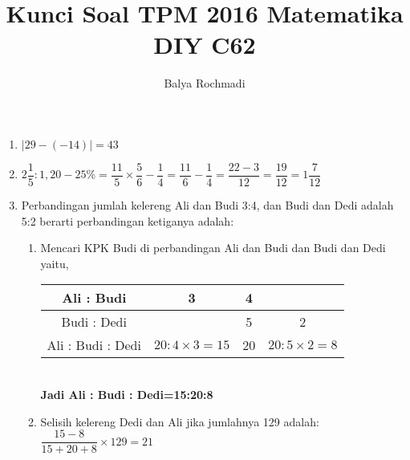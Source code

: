 \documentclass[10pt,a4paper]{article}
\author{Balya Rochmadi}
\title{Kunci Soal TPM 2016 Matematika DIY C62}
\begin{document}
    \maketitle
	\begin{enumerate}
	
	\item $\mid 29-(-14) \mid=43$
	\item $2\dfrac{1}{5} : 1,20 - 25\% = \dfrac{11}{5} \times \dfrac{5}{6} - \dfrac{1}{4} = \dfrac{11}{6}-\dfrac{1}{4}=\dfrac{22-3}{12}=\dfrac{19}{12}=1\dfrac{7}{12} $
	\item Perbandingan jumlah kelereng Ali dan Budi 3:4, dan Budi dan Dedi adalah 5:2 berarti perbandingan ketiganya adalah:
		\begin{enumerate}
		\item Mencari KPK Budi di perbandingan Ali dan Budi dan Budi dan Dedi yaitu,\\
			  \begin{tabular}{|c||c|c|c|}
			  	\hline 
			  	\rule[-1ex]{0pt}{2.5ex} Ali : Budi & 3 & 4 &  \\ 
			  	\hline 
			  	\rule[-1ex]{0pt}{2.5ex} Budi : Dedi &  & 5 & 2 \\ 
			  	\hline 
			  	\rule[-1ex]{0pt}{2.5ex} Ali : Budi : Dedi & $20:4 \times 3=15$  & 20 & $20:5 \times 2=8$ \\ 
			  	\hline 
			  	\end{tabular} 	
			  	\\
			   \textbf{Jadi Ali : Budi : Dedi=15:20:8}
		 \item Selisih kelereng Dedi dan Ali jika jumlahnya 129 adalah:\\  $\dfrac{15-8}{15+20+8}\times 129=21$
		 

\end{enumerate}
\end{enumerate}
\end{document}
